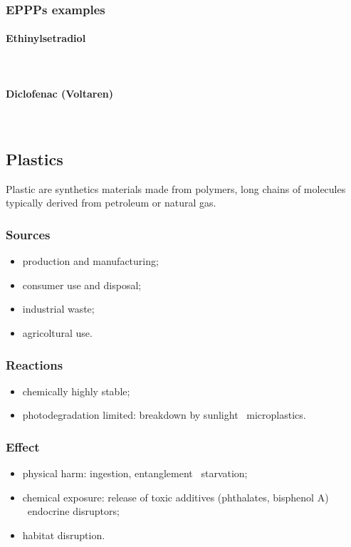 \documentclass{article}
\newcommand{\pph}[1]{\paragraph{#1}\phantom{}\\}
\begin{document}
\subsubsection{EPPPs examples}

\pph{Ethinylsetradiol}
\vspace*{-.3cm}
\begin{center}
\end{center}

\pph{Diclofenac (Voltaren)}
\vspace*{-.3cm}
\begin{center}
\end{center}

\newpage
\subsection{Plastics}
Plastic are synthetics materials made from polymers, long chains of molecules typically
derived from petroleum or natural gas.

\subsubsection{Sources}
\begin{itemize}
    \item production and manufacturing;
    \item consumer use and disposal;
    \item industrial waste;
    \item agricoltural use.
\end{itemize}

\subsubsection{Reactions}
\begin{itemize}
    \item chemically highly stable;
    \item photodegradation limited: breakdown by sunlight \textrightarrow\ microplastics.
\end{itemize}

\subsubsection{Effect}
\begin{itemize}
    \item physical harm: ingestion, entanglement \textrightarrow\ starvation;
    \item chemical exposure: release of toxic additives (phthalates, bisphenol A) \textrightarrow\ endocrine disruptors;
    \item habitat disruption.
\end{itemize}
\end{document}
